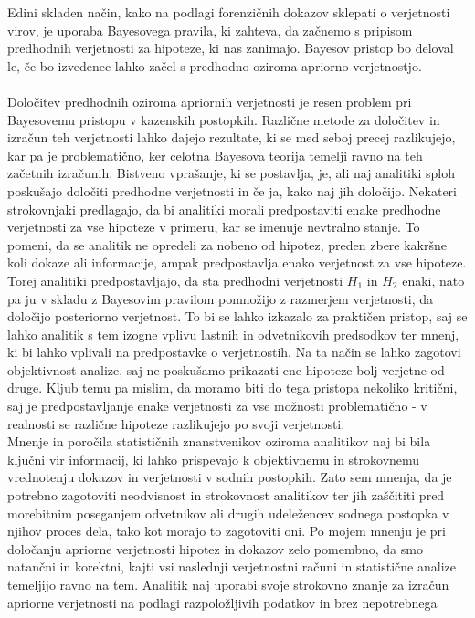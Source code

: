 \documentclass[12pt,a4paper]{amsart}
\theoremstyle{definition} %
\theoremstyle{plain} %
\begin{document}
Edini skladen način, kako na podlagi forenzičnih dokazov sklepati o verjetnosti virov, je uporaba Bayesovega pravila, ki zahteva, da začnemo s
pripisom predhodnih verjetnosti za hipoteze, ki nas zanimajo. Bayesov pristop bo deloval le, če bo izvedenec lahko začel s predhodno oziroma apriorno verjetnostjo.\\\\
Določitev predhodnih oziroma apriornih verjetnosti je resen problem pri Bayesovemu pristopu v kazenskih postopkih. Različne metode za določitev in izračun teh 
verjetnosti lahko dajejo rezultate, ki se med seboj precej razlikujejo, kar pa je problematično, ker celotna Bayesova teorija temelji ravno na teh začetnih 
izračunih. Bistveno vprašanje, ki se postavlja, je, ali naj analitiki sploh poskušajo določiti predhodne verjetnosti in če ja, kako naj jih določijo. Nekateri 
strokovnjaki predlagajo, da bi analitiki morali predpostaviti enake predhodne verjetnosti za vse hipoteze v primeru, kar se imenuje nevtralno 
stanje. To pomeni, da se analitik ne opredeli za nobeno od hipotez, preden zbere kakršne koli dokaze ali informacije, ampak predpostavlja enako 
verjetnost za vse hipoteze. Torej analitiki predpostavljajo, da sta predhodni verjetnosti $H_1$ in $H_2$ enaki, nato pa 
ju v skladu z Bayesovim pravilom pomnožijo z razmerjem verjetnosti, da določijo posteriorno verjetnost. To bi se lahko izkazalo za praktičen pristop, 
saj se lahko analitik s tem izogne vplivu lastnih in odvetnikovih predsodkov ter mnenj, ki bi lahko vplivali na predpostavke o verjetnostih. Na ta način se 
lahko zagotovi objektivnost analize, saj ne poskušamo prikazati ene hipoteze bolj verjetne od druge. Kljub temu pa mislim, da moramo biti do tega 
pristopa nekoliko kritični, saj je predpostavljanje enake verjetnosti za vse možnosti problematično - v realnosti se različne hipoteze razlikujejo po svoji 
verjetnosti.\\
Mnenje in poročila statističnih znanstvenikov oziroma analitikov naj bi bila ključni vir informacij, ki lahko prispevajo k objektivnemu in strokovnemu 
vrednotenju dokazov in verjetnosti v sodnih postopkih. Zato sem mnenja, da je potrebno zagotoviti neodvisnost in strokovnost analitikov ter jih 
zaščititi pred morebitnim poseganjem odvetnikov ali drugih udeležencev sodnega postopka v njihov proces dela, tako kot morajo to zagotoviti oni. Po mojem mnenju 
je pri določanju apriorne verjetnosti hipotez in dokazov zelo pomembno, da smo natančni in korektni, kajti vsi naslednji verjetnostni računi in statistične analize 
temeljijo ravno na tem. Analitik naj uporabi svoje strokovno znanje za izračun apriorne verjetnosti na podlagi razpoložljivih podatkov in brez nepotrebnega 
\end{document}

